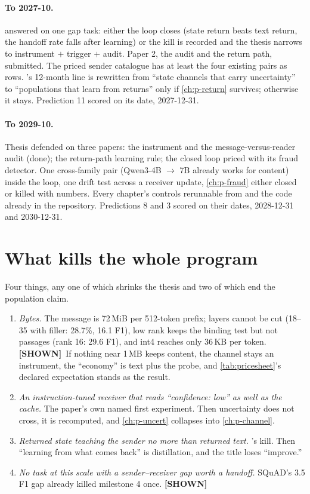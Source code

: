 \documentclass[11pt,a4paper]{report}
\newcommand{\SHOWN}{\textcolor{shownc}{\textbf{\scriptsize[SHOWN]}}}
\begin{document}
\paragraph{To 2027-10.}  answered on one gap task: either the loop closes (state return beats text return, the handoff rate falls after learning) or the kill is recorded and the thesis narrows to instrument $+$ trigger $+$ audit. Paper 2, the audit and the return path, submitted. The priced sender catalogue has at least the four existing pairs as rows. 's 12-month line is rewritten from ``state channels that carry uncertainty'' to ``populations that learn from returns'' only if \cref{ch:p-return} survives; otherwise it stays. Prediction 11 scored on its date, 2027-12-31.

\paragraph{To 2029-10.} Thesis defended on three papers: the instrument and the message-versus-reader audit (done); the return-path learning rule; the closed loop priced with its fraud detector. One cross-family pair (Qwen3-4B $\to$ 7B already works for content) inside the loop, one drift test across a receiver update, \cref{ch:p-fraud} either closed or killed with numbers. Every chapter's controls rerunnable from  and the code already in the repository. Predictions 8 and 3 scored on their dates, 2028-12-31 and 2030-12-31.

\section{What kills the whole program}

Four things, any one of which shrinks the thesis and two of which end the population claim.

\begin{enumerate}
\item \emph{Bytes.} The message is 72\,MiB per 512-token prefix; layers cannot be cut (18--35 with filler: 28.7\%, 16.1 F1), low rank keeps the binding test but not passages (rank 16: 29.6 F1), and int4 reaches only 36\,KB per token. \SHOWN\ If nothing near 1\,MB keeps content, the channel stays an instrument, the ``economy'' is text plus the probe, and \cref{tab:pricesheet}'s declared expectation stands as the result.
\item \emph{An instruction-tuned receiver that reads ``confidence: low'' as well as the cache.} The paper's own named first experiment. Then uncertainty does not cross, it is recomputed, and \cref{ch:p-uncert} collapses into \cref{ch:p-channel}.
\item \emph{Returned state teaching the sender no more than returned text.} 's kill. Then ``learning from what comes back'' is distillation, and the title loses ``improve.''
\item \emph{No task at this scale with a sender--receiver gap worth a handoff.} SQuAD's 3.5 F1 gap already killed milestone 4 once. \SHOWN
\end{enumerate}
\end{document}
